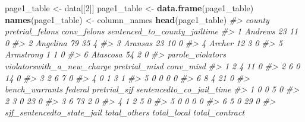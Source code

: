 \documentclass[
  12pt,
]{book}
\newenvironment{Shaded}{\begin{snugshade}}{\end{snugshade}}
\newcommand{\CommentTok}[1]{\textcolor[rgb]{0.37,0.37,0.37}{\textit{#1}}}
\newcommand{\DecValTok}[1]{\textcolor[rgb]{0.06,0.06,0.06}{#1}}
\newcommand{\KeywordTok}[1]{\textcolor[rgb]{0.27,0.27,0.27}{\textbf{#1}}}
\newcommand{\NormalTok}[1]{#1}
\newcommand{\StringTok}[1]{\textcolor[rgb]{0.5,0.5,0.5}{#1}}
\begin{document}
\begin{Shaded}
\begin{Highlighting}[]
\NormalTok{page1\_table \textless{}{-}}\StringTok{ }\NormalTok{data[[}\DecValTok{2}\NormalTok{]]}
\NormalTok{page1\_table \textless{}{-}}\StringTok{ }\KeywordTok{data.frame}\NormalTok{(page1\_table)}
\KeywordTok{names}\NormalTok{(page1\_table) \textless{}{-}}\StringTok{ }\NormalTok{column\_names}
\KeywordTok{head}\NormalTok{(page1\_table)}
\CommentTok{\#\textgreater{}      county pretrial\_felons conv\_felons sentenced\_to\_county\_jailtime}
\CommentTok{\#\textgreater{} 1   Andrews              23          11                            0}
\CommentTok{\#\textgreater{} 2  Angelina              79          35                            4}
\CommentTok{\#\textgreater{} 3   Aransas              23          10                            0}
\CommentTok{\#\textgreater{} 4    Archer              12           3                            0}
\CommentTok{\#\textgreater{} 5 Armstrong               1           1                            0}
\CommentTok{\#\textgreater{} 6  Atascosa              54           2                            0}
\CommentTok{\#\textgreater{}   parole\_violators violatorswith\_a\_new\_charge pretrial\_misd conv\_misd}
\CommentTok{\#\textgreater{} 1                2                          4            11         0}
\CommentTok{\#\textgreater{} 2                6                          0            14         0}
\CommentTok{\#\textgreater{} 3                2                          6             7         0}
\CommentTok{\#\textgreater{} 4                0                          1             3         1}
\CommentTok{\#\textgreater{} 5                0                          0             0         0}
\CommentTok{\#\textgreater{} 6                8                          4            21         0}
\CommentTok{\#\textgreater{}   bench\_warrants federal pretrial\_sjf sentencedto\_co\_jail\_time}
\CommentTok{\#\textgreater{} 1              0       0            5                        0}
\CommentTok{\#\textgreater{} 2              3       0           23                        0}
\CommentTok{\#\textgreater{} 3              6      73            2                        0}
\CommentTok{\#\textgreater{} 4              1       2            5                        0}
\CommentTok{\#\textgreater{} 5              0       0            0                        0}
\CommentTok{\#\textgreater{} 6              5       0           29                        0}
\CommentTok{\#\textgreater{}   sjf\_sentencedto\_state\_jail total\_others total\_local total\_contract}

\end{Highlighting}
\end{Shaded}
\end{document}
